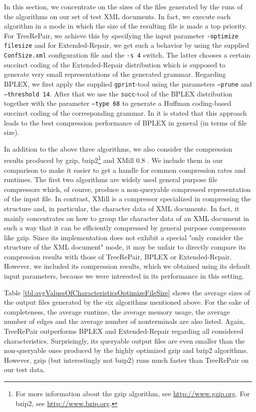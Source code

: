\documentclass[12pt]{llncs}
\newcommand{\trp}{\mbox{TreeRePair}\xspace}
\begin{document}
In this section, we concentrate on the sizes of the files generated by the runs of the algorithms on our set of test XML documents. In fact, we execute each algorithm in a mode in which the size of the resulting file is made a top priority. For \trp, we achieve this by specifying the input parameter \texttt{-optimize filesize} and for Extended-Repair, we get such a behavior by using the supplied \texttt{ConfSize.xml} configuration file and the \texttt{-s 4} switch. The latter chooses a certain succinct coding of the Extended-Repair distribution which is supposed to generate very small representations of the generated grammar. Regarding BPLEX, we first apply the supplied \texttt{gprint}-tool using the parameters \texttt{-\xspace-prune} and \texttt{-\xspace-threshold 14}. After that we use the \texttt{succ}-tool of the BPLEX distribution together with the parameter \texttt{-\xspace-type 68} to generate a Huffman coding-based succinct coding of the corresponding grammar. In \cite{Maneth08xml} it is stated that this approach leads to the best compression performance of BPLEX in general (in terms of file size).

In addition to the above three algorithms, we also consider the compression results produced by gzip, bzip2\footnote{For more information about the gzip algorithm, see \url{http://www.gzip.org}. For bzip2, see \url{http://www.bzip.org}.} and XMill 0.8 \cite{liefke2000xmill}. We include them in our comparison to make it easier to get a handle for common compression rates and runtimes. The first two algorithms are widely used general purpose file compressors which, of course, produce a non-queryable compressed representation of the input file. In contrast, XMill is a compressor specialized in compressing the structure and, in particular, the character data of XML documents. In fact, it mainly concentrates on how to group the character data of an XML document in such a way that it can be efficiently compressed by general purpose compressors like gzip. Since its implementation does not exhibit a special "only consider the structure of the XML document" mode, it may be unfair to directly compare its compression results with those of \trp, BPLEX or Extended-Repair. However, we included its compression results, which we obtained using its default input parameters, because we were interested in its performance in this setting.

Table \ref{tbl:avgValuesOfCharacteristicsOptimizeFileSize} shows the average sizes of the output files generated by the six algorithms mentioned above. For the sake of completeness, the average runtime, the average memory usage, the average number of edges and the average number of nonterminals are also listed. Again, \trp outperforms BPLEX and Extended-Repair regarding all considered characteristics. Surprisingly, its queryable output files are even smaller than the non-queryable ones produced by the highly optimized gzip and bzip2 algorithms. However, gzip (but interestingly not bzip2) runs much faster than \trp on our test data.
\end{document}
